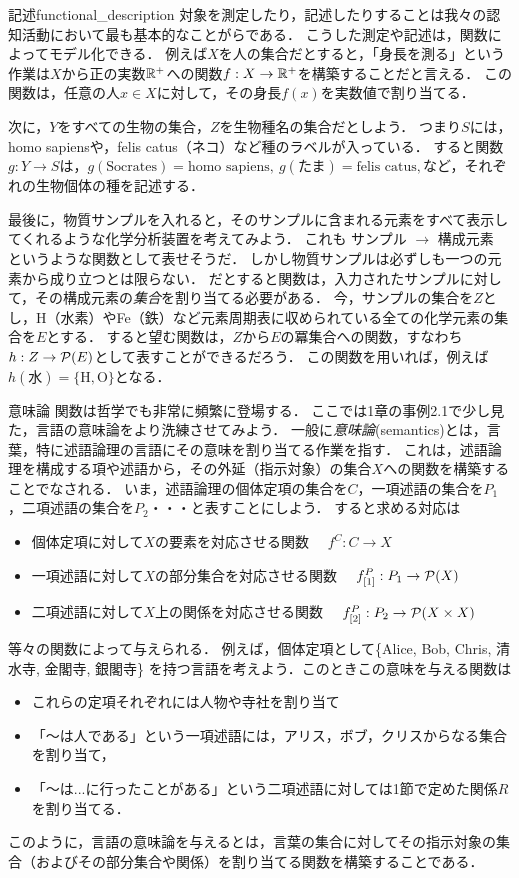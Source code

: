 \documentclass[dvipdfmx, 11pt,a4paper]{jsarticle}
\begin{document}
\begin{rei}{記述}{functional_description}
 対象を測定したり，記述したりすることは我々の認知活動において最も基本的なことがらである．
 こうした測定や記述は，関数によってモデル化できる．
 例えば$X$を人の集合だとすると，「身長を測る」という作業は$X$から正の実数$\mathbb{R}^+$への関数$f:X \to \mathbb{R}^+$を構築することだと言える．
 この関数は，任意の人$x \in X$に対して，その身長$f(x)$を実数値で割り当てる．

 次に，$Y$をすべての生物の集合，$Z$を生物種名の集合だとしよう．
 つまり$S$には，homo sapiensや，felis catus（ネコ）など種のラベルが入っている．
 すると関数$g: Y \to S$は，$g(\text{Socrates}) = \text{homo sapiens}, \ g(\text{たま}) = \text{felis catus}, $など，それぞれの生物個体の種を記述する．

 最後に，物質サンプルを入れると，そのサンプルに含まれる元素をすべて表示してくれるような化学分析装置を考えてみよう．
 これも サンプル $\rightarrow$ 構成元素 というような関数として表せそうだ．
 しかし物質サンプルは必ずしも一つの元素から成り立つとは限らない．
 だとすると関数は，入力されたサンプルに対して，その構成元素の\emph{集合}を割り当てる必要がある．
 今，サンプルの集合を$Z$とし，H（水素）やFe（鉄）など元素周期表に収められている全ての化学元素の集合を$E$とする．
 すると望む関数は，$Z$から$E$の冪集合への関数，すなわち$h:Z \to \mathcal{P}(E)$として表すことができるだろう．
 この関数を用いれば，例えば$h(\text{水}) = \{ \text{H}, \text{O}\}$となる．
\end{rei}

\begin{rei}{意味論}{}
関数は哲学でも非常に頻繁に登場する．
ここでは1章の事例2.1で少し見た，言語の意味論をより洗練させてみよう．
一般に\emph{意味論}(semantics)とは，言葉，特に述語論理の言語にその意味を割り当てる作業を指す．
これは，述語論理を構成する項や述語から，その外延（指示対象）の集合$X$への関数を構築することでなされる．
いま，述語論理の個体定項の集合を$C$，一項述語の集合を$P_1$，二項述語の集合を$P_2$・・・と表すことにしよう．
すると求める対応は
\begin{itemize}
 \item 個体定項に対して$X$の要素を対応させる関数 \ \ $f^C: C \to X$
 \item 一項述語に対して$X$の部分集合を対応させる関数 \ \ $f^P_{[1]}: P_1 \to \mathcal{P}(X)$
 \item 二項述語に対して$X$上の関係を対応させる関数 \ \ $f^P_{[2]}: P_2 \to \mathcal{P}(X \times X)$
\end{itemize}
等々の関数によって与えられる．
例えば，個体定項として\{Alice, Bob, Chris, 清水寺, 金閣寺, 銀閣寺\} を持つ言語を考えよう．このときこの意味を与える関数は
\begin{itemize}
 \item これらの定項それぞれには人物や寺社を割り当て
 \item 「〜は人である」という一項述語には，アリス，ボブ，クリスからなる集合を割り当て，
 \item 「〜は...に行ったことがある」という二項述語に対しては1節で定めた関係$R$を割り当てる．
\end{itemize}
このように，言語の意味論を与えるとは，言葉の集合に対してその指示対象の集合（およびその部分集合や関係）を割り当てる関数を構築することである．
\end{rei}
\end{document}
